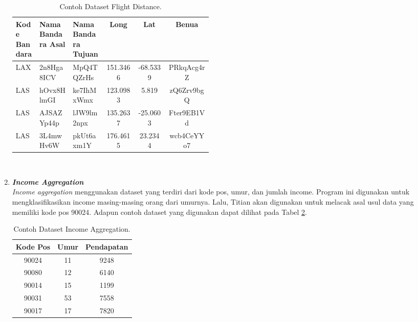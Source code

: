 \begin{enumerate}
            \begin{longtable}{|p{0.12\linewidth}|p{0.17\linewidth}|p{0.17\linewidth}|c|c|c|}
                  \caption{Contoh Dataset Flight Distance.}
                  \label{tb:flightdistancedataset} \\
                  \hline
                  \rowcolor[HTML]{C0C0C0}
                  \raggedright{\textbf{Kode Bandara}} & \raggedright{\textbf{Nama Bandara Asal}} & \raggedright{\textbf{Nama Bandara Tujuan}} & \textbf{Long} & \textbf{Lat} & \textbf{Benua} \\
                  \hline
                  LAX & 2n8Hga8ICV & MpQ4TQZrHs & 151.3466 & -68.5339 & PRkqAcg4rZ \\
                  LAS & hOvx8HlmGI & ke7IhMxWmx & 123.0983 & 5.819 & zQ6Zrv9bgQ \\
                  LAS & AJSAZYp44p & lJW9lm2npx & 135.2637 & -25.0603 & Fter9EB1Vd \\
                  LAS & 3L4mwHv6W & pkUt6axm1Y & 176.4615 & 23.2344 & wcb4CeYYo7 \\
                  \hline
            \end{longtable}
      
      \
            
      \item \emph{\textbf{Income Aggregation}} \\
            \emph{Income aggregation} menggunakan dataset yang terdiri dari kode pos, umur, dan jumlah income. Program ini digunakan untuk mengklasifikasikan income masing-masing orang dari umurnya. Lalu, Titian akan digunakan untuk melacak asal usul data yang memiliki kode pos 90024.
            Adapun contoh dataset yang digunakan dapat 
            dilihat pada Tabel \ref{tb:incomeaggregationdataset}.

            \begin{longtable}{|c|c|c|}
                  \caption{Contoh Dataset Income Aggregation.}
                  \label{tb:incomeaggregationdataset} \\
                  \hline
                  \rowcolor[HTML]{C0C0C0}
                  \textbf{Kode Pos} & \textbf{Umur} & \textbf{Pendapatan} \\
                  \hline
                  90024 & 11 & 9248 \\
                  90080 & 12 & 6140 \\
                  90014 & 15 & 1199 \\
                  90031 & 53 & 7558 \\
                  90017 & 17 & 7820 \\
                  \hline
            \end{longtable}


\end{enumerate}
